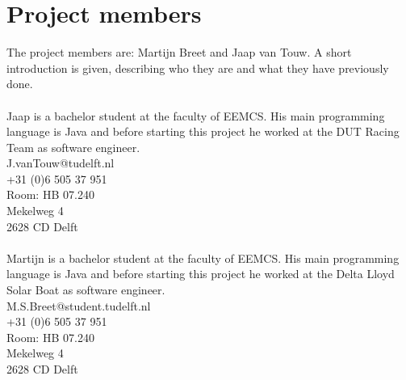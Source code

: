 \section{Project members}
The project members are: Martijn Breet and Jaap van Touw. A short introduction is given, describing who they are and what they have previously done.\\

\\
Jaap is a bachelor student at the faculty of EEMCS. His main programming language is Java and before starting this project he worked at the DUT Racing Team as software engineer.\\

\noindent
J.vanTouw@tudelft.nl\\
+31 (0)6 505 37 951\\
Room: HB 07.240\\
Mekelweg 4\\
2628 CD Delft\\

\\
Martijn is a bachelor student at the faculty of EEMCS. His main programming language is Java and before starting this project he worked at the Delta Lloyd Solar Boat as software engineer.\\

\noindent
M.S.Breet@student.tudelft.nl \\
+31 (0)6 505 37 951\\
Room: HB 07.240\\
Mekelweg 4\\
2628 CD Delft\\